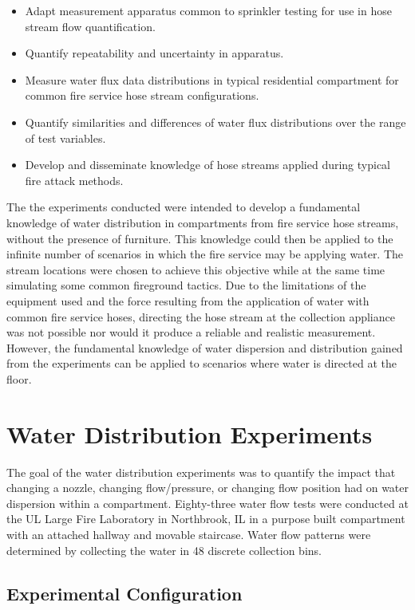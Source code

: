 \documentclass[12pt,oneside]{book}
\begin{document}
\begin{itemize}
	\setlength{\itemindent}{0.25in}
	\item Adapt measurement apparatus common to sprinkler testing for use in hose stream flow quantification.
	\item Quantify repeatability and uncertainty in apparatus.
	\item Measure water flux data distributions in typical residential compartment for common fire service hose stream configurations.
	\item Quantify similarities and differences of water flux distributions over the range of test variables.
	\item Develop and disseminate knowledge of hose streams applied during typical fire attack methods.
	\end{itemize}

The the experiments conducted were intended to develop a fundamental knowledge of water distribution in compartments from fire service hose streams, without the presence of furniture. This knowledge could then be applied to the infinite number of scenarios in which the fire service may be applying water. The stream locations were chosen to achieve this objective while at the same time simulating some common fireground tactics. Due to the limitations of the equipment used and the force resulting from the application of water with common fire service hoses, directing the hose stream at the collection appliance was not possible nor would it produce a reliable and realistic measurement. However, the fundamental knowledge of water dispersion and distribution gained from the experiments can be applied to scenarios where water is directed at the floor. 

\chapter{Water Distribution Experiments}

The goal of the water distribution experiments was to quantify the impact that changing a nozzle, changing flow/pressure, or changing flow position had on water dispersion within a compartment. Eighty-three water flow tests were conducted at the UL Large Fire Laboratory in Northbrook, IL in a purpose built compartment with an attached hallway and movable staircase. Water flow patterns were determined by collecting the water in 48 discrete collection bins.

\section{Experimental Configuration}
\end{document}
